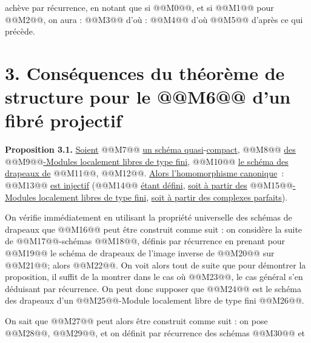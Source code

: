 
achève par
récurrence, en notant que si @@M0@@, et si @@M1@@ pour @@M2@@, on aura :
@@M3@@
d'où :
@@M4@@
d'où @@M5@@ d'après ce qui précède.

\section*{3. Conséquences du théorème de structure pour le @@M6@@ d'un fibré projectif}

\textbf{Proposition 3.1.} \uline{Soient} @@M7@@ \uline{un schéma quasi}-\uline{compact}, @@M8@@ \uline{des} @@M9@@\uline{-Modules localement libres de type fini}, @@M10@@ \uline{le schéma des drapeaux de} @@M11@@, @@M12@@.
\uline{Alors l'homomorphisme canonique}~:
@@M13@@
\uline{est injectif} (@@M14@@ \uline{étant défini}, \uline{soit à partir des} @@M15@@\uline{-Modules localement libres de type fini}, \uline{soit à partir des complexes parfaits}).

On vérifie immédiatement en utilisant la propriété universelle des schémas de drapeaux que @@M16@@ peut être construit comme suit : on considère la suite de @@M17@@-schémas @@M18@@, définis par récurrence en prenant pour @@M19@@ le schéma de drapeaux de l'image inverse de @@M20@@ sur @@M21@@; alors @@M22@@. On voit alors tout de suite que pour démontrer la proposition, il suffit de la montrer dans le cas où @@M23@@, le cas général s'en déduisant par récurrence. On peut donc supposer que @@M24@@ est le schéma des drapeaux d'un @@M25@@-Module localement libre de type fini @@M26@@.

On sait que @@M27@@ peut alors être construit comme suit : on pose @@M28@@, @@M29@@, et on définit par récurrence des schémas @@M30@@ et
